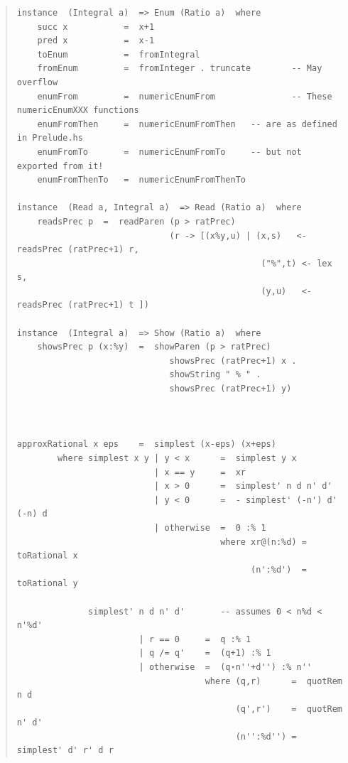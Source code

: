\begin{quote}
{\begin{verbatim}
instance  (Integral a)  => Enum (Ratio a)  where
    succ x           =  x+1
    pred x           =  x-1
    toEnum           =  fromIntegral
    fromEnum         =  fromInteger . truncate        -- May overflow
    enumFrom         =  numericEnumFrom               -- These numericEnumXXX functions
    enumFromThen     =  numericEnumFromThen   -- are as defined in Prelude.hs
    enumFromTo       =  numericEnumFromTo     -- but not exported from it!
    enumFromThenTo   =  numericEnumFromThenTo

instance  (Read a, Integral a)  => Read (Ratio a)  where
    readsPrec p  =  readParen (p > ratPrec)
                              (r -> [(x%y,u) | (x,s)   <- readsPrec (ratPrec+1) r,
                                                ("%",t) <- lex s,
                                                (y,u)   <- readsPrec (ratPrec+1) t ])

instance  (Integral a)  => Show (Ratio a)  where
    showsPrec p (x:%y)  =  showParen (p > ratPrec)
                              showsPrec (ratPrec+1) x .
                              showString " % " .
                              showsPrec (ratPrec+1) y)



approxRational x eps    =  simplest (x-eps) (x+eps)
        where simplest x y | y < x      =  simplest y x
                           | x == y     =  xr
                           | x > 0      =  simplest' n d n' d'
                           | y < 0      =  - simplest' (-n') d' (-n) d
                           | otherwise  =  0 :% 1
                                        where xr@(n:%d) = toRational x
                                              (n':%d')  = toRational y

              simplest' n d n' d'       -- assumes 0 < n%d < n'%d'
                        | r == 0     =  q :% 1
                        | q /= q'    =  (q+1) :% 1
                        | otherwise  =  (q⋆n''+d'') :% n''
                                     where (q,r)      =  quotRem n d
                                           (q',r')    =  quotRem n' d'
                                           (n'':%d'') =  simplest' d' r' d r
\end{verbatim}}
\end{quote}